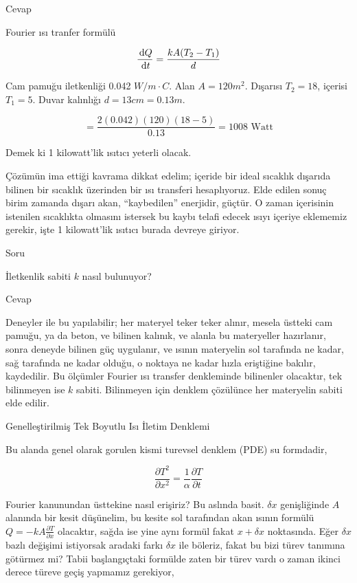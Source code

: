 \documentclass[12pt,fleqn]{article}\usepackage{../../common}
\begin{document}
Cevap

Fourier ısı tranfer formülü

$$
\frac{\,\mathrm{d} Q}{\,\mathrm{d} t} = \frac{k A (T_2 - T_1)}{d}
$$

Cam pamuğu iletkenliği 0.042 $W / m \cdot C$. Alan $A = 120 m^2$. Dışarısı $T_2
= 18$, içerisi $T_1 = 5$. Duvar kalınlığı $d = 13 cm = 0.13 m$.

$$
= \frac{2 (0.042) (120) (18-5)}{0.13} = 1008 \textrm{ Watt}
$$

Demek ki 1 kilowatt'lik ısıtıcı yeterli olacak.

Çözümün ima ettiği kavrama dikkat edelim; içeride bir ideal sıcaklık dışarıda
bilinen bir sıcaklık üzerinden bir ısı transferi hesaplıyoruz. Elde edilen sonuç
birim zamanda dışarı akan, ``kaybedilen'' enerjidir, güçtür. O zaman içerisinin
istenilen sıcaklıkta olmasını istersek bu kaybı telafi edecek ısıyı içeriye
eklememiz gerekir, işte 1 kilowatt'lik ısıtıcı burada devreye giriyor.

Soru

İletkenlik sabiti $k$ nasıl bulunuyor?

Cevap

Deneyler ile bu yapılabilir; her materyel teker teker alınır, mesela üstteki cam
pamuğu, ya da beton, ve bilinen kalınık, ve alanla bu materyeller hazırlanır,
sonra deneyde bilinen güç uygulanır, ve ısının materyelin sol tarafında ne
kadar, sağ tarafında ne kadar olduğu, o noktaya ne kadar hızla eriştiğine
bakılır, kaydedilir. Bu ölçümler Fourier ısı transfer denkleminde bilinenler
olacaktır, tek bilinmeyen ise $k$ sabiti. Bilinmeyen için denklem çözülünce her
materyelin sabiti elde edilir.

Genelleştirilmiş Tek Boyutlu Isı İletim Denklemi

Bu alanda genel olarak gorulen kismi turevsel denklem (PDE) su formdadir,

$$
\frac{\partial T^2}{\partial x^2} = \frac{1}{\alpha} \frac{\partial T}{\partial t}
$$

Fourier kanunundan üsttekine nasıl erişiriz? Bu aslında basit. $\delta x$
genişliğinde $A$ alanında bir kesit düşünelim, bu kesite sol tarafından akan
ısının formülü $Q = -kA \frac{\partial T}{\partial x}$ olacaktır, sağda ise yine
aynı formül fakat $x + \delta x$ noktasında. Eğer $\delta x$ bazlı değişimi
istiyorsak aradaki farkı $\delta x$ ile böleriz, fakat bu bizi türev tanımına
götürmez mi? Tabii başlangıçtaki formülde zaten bir türev vardı o zaman ikinci
derece türeve geçiş yapmamız gerekiyor,
\end{document}
